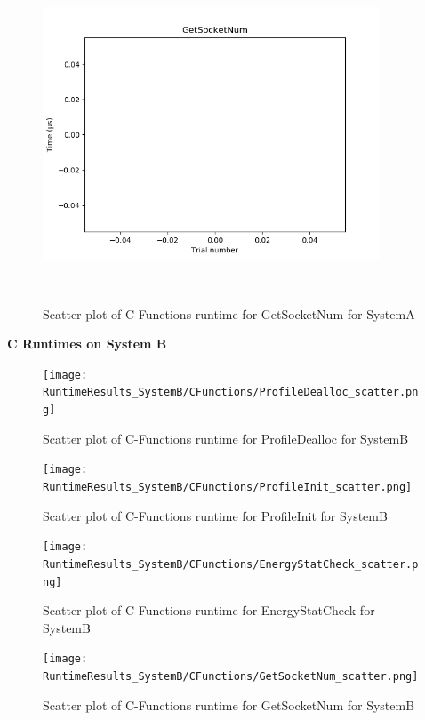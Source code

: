 \documentclass{article}
\begin{document}
\begin{figure}[H]
	\centering
	\includegraphics[width=10cm,height=10cm,keepaspectratio]{RuntimeResults_SystemA/CFunctions/GetSocketNum_scatter.png}
	\caption{Scatter plot of C-Functions runtime for GetSocketNum for SystemA}
	\label{fig:C-Functions|GetSocketNum|SystemA}
\end{figure}

\textbf{C Runtimes on System B}

\begin{figure}[H]
	\centering
	\texttt{[image: RuntimeResults\_SystemB/CFunctions/ProfileDealloc\_scatter.png]}
	\caption{Scatter plot of C-Functions runtime for ProfileDealloc for SystemB}
	\label{fig:C-Functions|ProfileDealloc|SystemB}
\end{figure}

\begin{figure}[H]
	\centering
	\texttt{[image: RuntimeResults\_SystemB/CFunctions/ProfileInit\_scatter.png]}
	\caption{Scatter plot of C-Functions runtime for ProfileInit for SystemB}
	\label{fig:C-Functions|ProfileInit|SystemB}
\end{figure}

\begin{figure}[H]
	\centering
	\texttt{[image: RuntimeResults\_SystemB/CFunctions/EnergyStatCheck\_scatter.png]}
	\caption{Scatter plot of C-Functions runtime for EnergyStatCheck for SystemB}
	\label{fig:C-Functions|EnergyStatCheck|SystemB}
\end{figure}

\begin{figure}[H]
	\centering
	\texttt{[image: RuntimeResults\_SystemB/CFunctions/GetSocketNum\_scatter.png]}
	\caption{Scatter plot of C-Functions runtime for GetSocketNum for SystemB}
	\label{fig:C-Functions|GetSocketNum|SystemB}
\end{figure}
\end{document}
